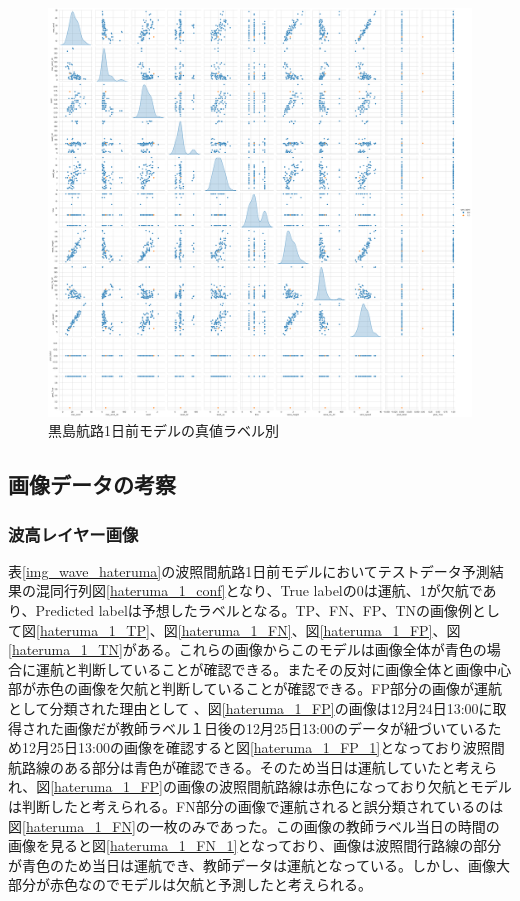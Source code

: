 \begin{figure}[H]
 \centering
 \includegraphics[keepaspectratio, scale=0.25]{fig/chapter4/kurosima_1_ture.png}
 \caption{黒島航路1日前モデルの真値ラベル別}
 \label{kurosima_1_scatter_ture}
\end{figure}

\subsection{画像データの考察}
\subsubsection{波高レイヤー画像}

表\ref{img_wave_hateruma}の波照間航路1日前モデルにおいてテストデータ予測結果の混同行列図\ref{hateruma_1_conf}となり、True labelの0は運航、1が欠航であり、Predicted labelは予想したラベルとなる。TP、FN、FP、TNの画像例として図\ref{hateruma_1_TP}、図\ref{hateruma_1_FN}、図\ref{hateruma_1_FP}、図\ref{hateruma_1_TN}がある。これらの画像からこのモデルは画像全体が青色の場合に運航と判断していることが確認できる。またその反対に画像全体と画像中心部が赤色の画像を欠航と判断していることが確認できる。FP部分の画像が運航として分類された理由として
、図\ref{hateruma_1_FP}の画像は12月24日13:00に取得された画像だが教師ラベル１日後の12月25日13:00のデータが紐づいているため12月25日13:00の画像を確認すると図\ref{hateruma_1_FP_1}となっており波照間航路線のある部分は青色が確認できる。そのため当日は運航していたと考えられ、図\ref{hateruma_1_FP}の画像の波照間航路線は赤色になっており欠航とモデルは判断したと考えられる。FN部分の画像で運航されると誤分類されているのは図\ref{hateruma_1_FN}の一枚のみであった。この画像の教師ラベル当日の時間の画像を見ると図\ref{hateruma_1_FN_1}となっており、画像は波照間行路線の部分が青色のため当日は運航でき、教師データは運航となっている。しかし、画像大部分が赤色なのでモデルは欠航と予測したと考えられる。

